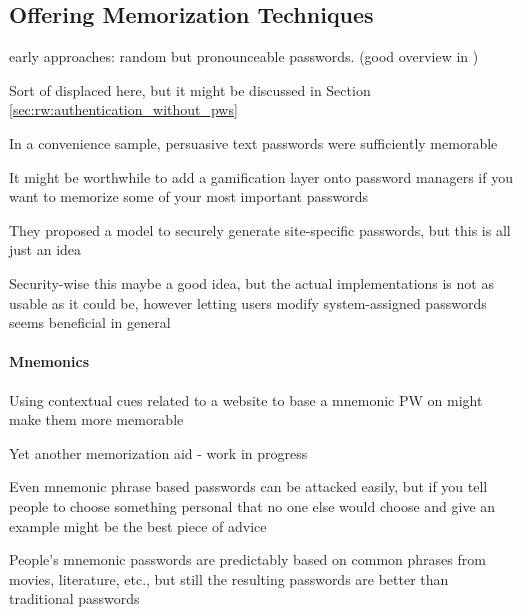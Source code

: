 	
	\subsection{Offering Memorization Techniques}
	
	
	early approaches: random but pronounceable passwords. (good overview in \cite{Kuo2006HumanSelectionMnemonic})
	
	\cite{Bonneau2014ReliableStorage56Bits}
	\cite{Forget2007HelpingUsers}
	Sort of displaced here, but it might be discussed in Section \ref{sec:rw:authentication_without_pws} \cite{Forget2015CYOA}
	\cite{Brown2004GeneratingPWs}
	
	In a convenience sample, persuasive text passwords were sufficiently memorable \cite{Forget2008MemorabilityPersuasivePasswords}
	
	It might be worthwhile to add a gamification layer onto password managers if you want to memorize some of your most important passwords \cite{Kroeze2012GamifyingAuthentication}
	
	They proposed a model to securely generate site-specific passwords, but this is all just an idea \cite{Maqbali2016PasswordGenerators}
	
	
	Security-wise this maybe a good idea, but the actual implementations is not as usable as it could be, however letting users modify system-assigned passwords seems beneficial in general \cite{Huha2015UserReplaceablePasswords}
	
	\paragraph{Mnemonics}
	Using contextual cues related to a website to base a mnemonic PW on might make them more memorable \cite{Mcevoy2016ContextualizingMnemonicPhrase}
	
	Yet another memorization aid - work in progress \cite{Lyastani2016PWMangling} 
	
	Even mnemonic phrase based passwords can be attacked easily, but if you tell people to choose something personal that no one else would choose and give an example might be the best piece of advice \cite{Yang2016MnemonicSentenceBased}
	
	People's mnemonic passwords are predictably based on common phrases from movies, literature, etc., but still the resulting passwords are better than traditional passwords \cite{Kuo2006HumanSelectionMnemonic}
	
